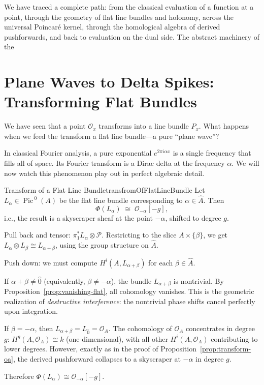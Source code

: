 \documentclass{article}
\newcommand{\CO}{{\mathcal{O}}}
\newcommand{\CP}{{\mathcal{P}}}
\newcommand{\Pic}{{\operatorname{Pic}\,}}
\begin{document}
We have traced a complete path: from the classical evaluation of a function at a point, through the geometry of flat line bundles and holonomy, across the universal Poincar\'{e} kernel, through the homological algebra of derived pushforwards, and back to evaluation on the dual side. The abstract machinery of the

\section{Plane Waves to Delta Spikes: Transforming Flat Bundles}

We have seen that a point $\CO_x$ transforms into a line bundle $P_x$. What happens when we feed the transform a flat line bundle---a pure ``plane wave''?

In classical Fourier analysis, a pure exponential $e^{2\pi i \alpha x}$ is a single frequency that fills all of space. Its Fourier transform is a Dirac delta at the frequency $\alpha$. We will now watch this phenomenon play out in perfect algebraic detail.

\begin{thm}{Transform of a Flat Line Bundle}{transfromOfFlatLineBundle}
Let $L_\alpha \in \Pic^0(A)$ be the flat line bundle corresponding to $\alpha \in \hat{A}$. Then
\[
    \Phi(L_\alpha) \;\cong\; \CO_{-\alpha}[-g],
\]
i.e., the result is a skyscraper sheaf at the point $-\alpha$, shifted to degree $g$.
\end{thm}

\begin{Proof}
Pull back and tensor: $\pi_1^* L_\alpha \otimes \CP$. Restricting to the slice $A \times \{\beta\}$, we get $L_\alpha \otimes L_\beta \cong L_{\alpha + \beta}$, using the group structure on $\hat{A}$.

Push down: we must compute $H^i(A, L_{\alpha + \beta})$ for each $\beta \in \hat{A}$.

If $\alpha + \beta \neq \hat{0}$ (equivalently, $\beta \neq -\alpha$), the bundle $L_{\alpha+\beta}$ is nontrivial. By Proposition~\ref{prop:vanishing-flat}, all cohomology vanishes. This is the geometric realization of \emph{destructive interference}: the nontrivial phase shifts cancel perfectly upon integration.

If $\beta = -\alpha$, then $L_{\alpha + \beta} = L_{\hat{0}} = \CO_A$. The cohomology of $\CO_A$ concentrates in degree $g$: $H^g(A, \CO_A) \cong k$ (one-dimensional), with all other $H^i(A, \CO_A)$ contributing to lower degrees. However, exactly as in the proof of Proposition~\ref{prop:transform-oa}, the derived pushforward collapses to a skyscraper at $-\alpha$ in degree $g$.

Therefore $\Phi(L_\alpha) \cong \CO_{-\alpha}[-g]$.
\end{Proof}
\end{document}
